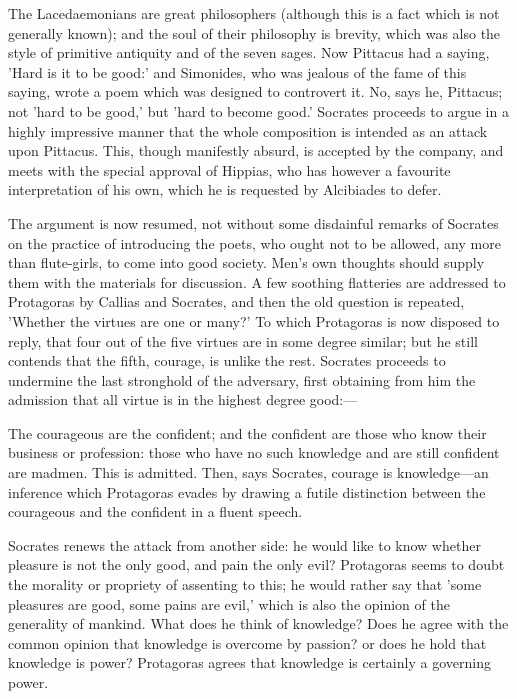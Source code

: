 \documentclass[11pt,letter]{article}
\begin{document}
\par  The Lacedaemonians are great philosophers (although this is a fact which is not generally known); and the soul of their philosophy is brevity, which was also the style of primitive antiquity and of the seven sages. Now Pittacus had a saying, 'Hard is it to be good:' and Simonides, who was jealous of the fame of this saying, wrote a poem which was designed to controvert it. No, says he, Pittacus; not 'hard to be good,' but 'hard to become good.' Socrates proceeds to argue in a highly impressive manner that the whole composition is intended as an attack upon Pittacus. This, though manifestly absurd, is accepted by the company, and meets with the special approval of Hippias, who has however a favourite interpretation of his own, which he is requested by Alcibiades to defer.

\par  The argument is now resumed, not without some disdainful remarks of Socrates on the practice of introducing the poets, who ought not to be allowed, any more than flute-girls, to come into good society. Men's own thoughts should supply them with the materials for discussion. A few soothing flatteries are addressed to Protagoras by Callias and Socrates, and then the old question is repeated, 'Whether the virtues are one or many?' To which Protagoras is now disposed to reply, that four out of the five virtues are in some degree similar; but he still contends that the fifth, courage, is unlike the rest. Socrates proceeds to undermine the last stronghold of the adversary, first obtaining from him the admission that all virtue is in the highest degree good:—

\par  The courageous are the confident; and the confident are those who know their business or profession: those who have no such knowledge and are still confident are madmen. This is admitted. Then, says Socrates, courage is knowledge—an inference which Protagoras evades by drawing a futile distinction between the courageous and the confident in a fluent speech.

\par  Socrates renews the attack from another side: he would like to know whether pleasure is not the only good, and pain the only evil? Protagoras seems to doubt the morality or propriety of assenting to this; he would rather say that 'some pleasures are good, some pains are evil,' which is also the opinion of the generality of mankind. What does he think of knowledge? Does he agree with the common opinion that knowledge is overcome by passion? or does he hold that knowledge is power? Protagoras agrees that knowledge is certainly a governing power.
\end{document}
